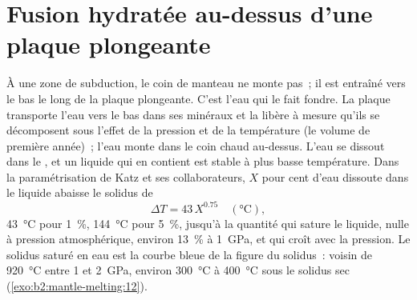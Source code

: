 \begin{omfigure}
\centering
{}
\par{}
\end{omfigure}

\section{Fusion hydratée au-dessus d'une plaque plongeante}\label{sec:b2:mantle-melting:flux}

À une zone de subduction, le coin de manteau ne monte pas~; il est entraîné vers le bas le long
de la plaque plongeante. C'est l'eau qui le fait fondre. La plaque transporte l'eau vers le bas dans ses
minéraux et la libère à mesure qu'ils se décomposent sous l'effet de la pression et de la température
(le volume de première année)~; l'eau monte dans le coin chaud au-dessus. L'eau se dissout dans le , et un
liquide qui en contient est stable à plus basse température. Dans la paramétrisation de
Katz et ses collaborateurs, $X$ pour cent d'eau dissoute dans le liquide abaisse le solidus de
\[
  \Delta T = 43\,X^{0.75} \quad (\unit{\celsius}),
\]
\qty{43}{\celsius} pour \qty{1}{\percent}, \qty{144}{\celsius} pour
\qty{5}{\percent}, jusqu'à la quantité qui sature le liquide, nulle à pression atmosphérique,
environ \qty{13}{\percent} à \qty{1}{GPa}, et qui croît avec la
pression. Le solidus saturé en eau est la courbe bleue de la figure du solidus~:
voisin de \qty{920}{\celsius} entre 1 et \qty{2}{GPa}, environ \qty{300}{\celsius} à
\qty{400}{\celsius} sous le solidus sec (\cref{exo:b2:mantle-melting:12}).

